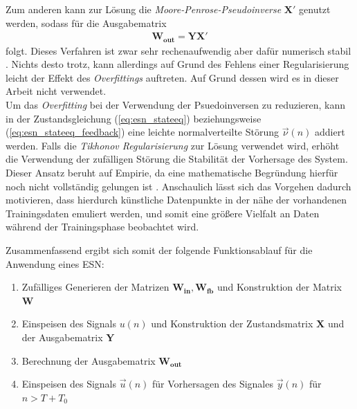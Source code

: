 Zum anderen kann zur Lösung die \textit{Moore-Penrose-Pseudoinverse} $\mathbf{X}'$ genutzt werden, sodass für die Ausgabematrix
\begin{align}
\label{eq:pseudo_inverse}
\mathbf{W_{out}} = \mathbf{Y} \mathbf{X}'
\end{align}
folgt. Dieses Verfahren ist zwar sehr rechenaufwendig aber dafür numerisch stabil \cite{lukoseviciusa2009, jaeger2012}. Nichts desto trotz, kann allerdings auf Grund des Fehlens einer Regularisierung leicht der Effekt des \textit{Overfittings} auftreten. Auf Grund dessen wird es in dieser Arbeit nicht verwendet.\\

Um das \textit{Overfitting} bei der Verwendung der Psuedoinversen zu reduzieren, kann in der Zustandsgleichung (\ref{eq:esn_stateeq}) beziehungsweise (\ref{eq:esn_stateeq_feedback}) eine leichte normalverteilte Störung $\vec{\nu}(n)$ addiert werden. Falls die \textit{Tikhonov Regularisierung} zur Lösung verwendet wird, erhöht die Verwendung der zufälligen Störung die Stabilität der Vorhersage des System. Dieser Ansatz beruht auf Empirie, da eine mathematische Begründung hierfür noch nicht vollständig gelungen ist \citep{jaeger2010, lukoseviciusa2009}. Anschaulich lässt sich das Vorgehen dadurch motivieren, dass hierdurch künstliche Datenpunkte in der nähe der vorhandenen Trainingsdaten emuliert werden, und somit eine größere Vielfalt an Daten während der Trainingsphase beobachtet wird.\\

\begin{minipage}{\textwidth}
Zusammenfassend ergibt sich somit der folgende Funktionsablauf für die Anwendung eines \textsc{ESN}:

\singlespacing
\begin{enumerate}
	\item Zufälliges Generieren der Matrizen $\mathbf{W_{in}}, \mathbf{W_{fb}}$ und Konstruktion der Matrix $\mathbf{W}$ 
	\item Einspeisen des Signals $u(n)$ und Konstruktion der Zustandsmatrix $\mathbf{X}$ und der Ausgabematrix $\mathbf{Y}$ 
	\item Berechnung der Ausgabematrix $\mathbf{W_{out}}$
	\item Einspeisen des Signals $\vec{u}(n)$ für Vorhersagen des Signales $\vec{y}(n)$ für $n > T + T_0$
\end{enumerate}
\onehalfspacing
\end{minipage}

